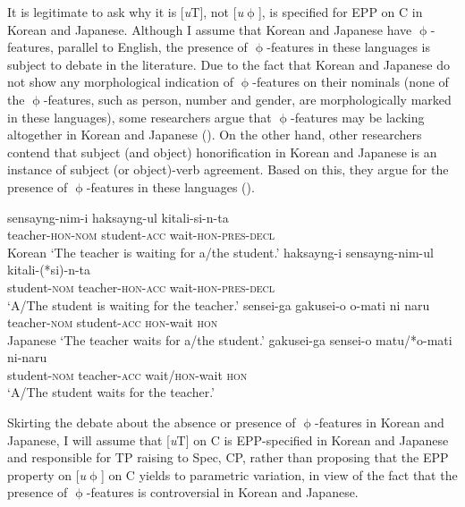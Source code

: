 It is legitimate to ask why it is [\textit{u}T], not [\textit{u}$\upphi$], is specified for \ac{EPP} on C in Korean and Japanese. Although I assume that Korean and Japanese have $\upphi$-features, parallel to English, the presence of $\upphi$-features in these languages is subject to debate in the literature. Due to the fact that Korean and Japanese do not show any morphological indication of $\upphi$-features on their nominals (none of the $\upphi$-features, such as person, number and gender, are morphologically marked in these languages), some researchers argue that $\upphi$-features may be lacking altogether in Korean and Japanese (\citealt{Kuroda1988,Namai2000,Saito2007,Saito2011,SellsKim2007,SenerTakahashi2009}). On the other hand, other researchers contend that subject (and object) honorification in Korean and Japanese is an instance of subject (or object)-verb agreement. Based on this, they argue for the presence of $\upphi$-features in these languages (\citealt{Ahn2002LVC,BoeckxNiinuma2004,Choe2004,Harada1976,Hasegawa2005,Koopman2005,Takita2006}). 

\ea\label{ex:92}
    \ea \gll sensayng-nim-i    haksayng-ul kitali-si-n-ta        \\
    teacher-\textsc{hon-nom} student-\textsc{acc} wait-\textsc{hon-pres-decl} \\ \hfill Korean
    \glt `The teacher is waiting for a/the student.'
    \ex \gll haksayng-i   sensayng-nim-ul  kitali-(*si)-n-ta \\
    student-\textsc{nom} teacher-\textsc{hon-acc} wait-\textsc{hon-pres-decl} \\
    \glt `A/The student is waiting for the teacher.'
    \ex \gll  sensei-ga      gakusei-o     o-mati      ni naru      \\
      teacher-\textsc{nom} student-\textsc{acc} \textsc{hon}{}-wait \textsc{hon} \\ \hfill Japanese
      \glt  `The teacher waits for a/the student.'
    \ex \gll gakusei-ga    sensei-o        matu/*o-mati ni-naru \\
    student-\textsc{nom} teacher-\textsc{acc} wait/\textsc{hon}{}-wait \textsc{hon} \\ 
    \glt `A/The student waits for the teacher.'
    \z
\z

Skirting the debate about the absence or presence of $\upphi$-features in Korean and Japanese, I will assume that [\textit{u}T] on C is \ac{EPP}-specified in Korean and Japanese and responsible for \ac{TP} raising to Spec, \ac{CP}, rather than proposing that the \ac{EPP} property on [\textit{u}$\upphi$] on C yields to parametric variation, in view of the fact that the presence of $\upphi$-features is controversial in Korean and Japanese.

